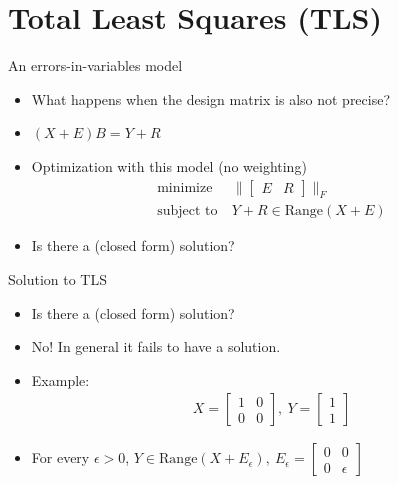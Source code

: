 \documentclass[handout]{beamer}
\begin{document}
\section{Total Least Squares (TLS)}
%
\begin{frame}{An errors-in-variables model}
\begin{itemize}
\item What happens when the design matrix is also not precise?
\item $(X + E)B = Y + R$
\item Optimization with this model (no weighting)
\begin{equation}
\begin{aligned}
\text{minimize} &\ \|\begin{bmatrix} E & R\end{bmatrix}\|_{F} \\
\text{subject to} &\ Y + R \in \text{Range}(X + E)
\end{aligned}
\end{equation}
\item Is there a (closed form) solution?
\end{itemize}
\end{frame}
%
\begin{frame}{Solution to TLS}
\begin{itemize}
\item Is there a (closed form) solution?
\item No! In general it fails to have a solution.
\item Example:
\begin{equation}
\begin{aligned}
X = \begin{bmatrix}
   1 & 0 \\ 0 & 0
 \end{bmatrix}, \ Y = \begin{bmatrix}
 1 \\ 1
 \end{bmatrix} 
\end{aligned}
\end{equation}
\item For every $\epsilon > 0$, $Y \in \text{Range}(X + E_{\epsilon}), \ E_{\epsilon} = \begin{bmatrix} 0 & 0 \\ 0 & \epsilon \end{bmatrix}$
\end{itemize}
\end{frame}
%
\end{document}
